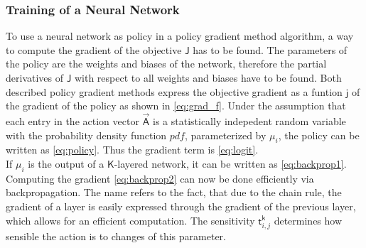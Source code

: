 \subsubsection{Training of a Neural Network}
To use a neural network as policy in a policy gradient method algorithm, a way to compute the gradient of the objective $\mathsf{J}$ has to be found. The parameters of the policy are the weights and biases of the network, therefore the partial derivatives of $\mathsf{J}$ with respect to all weights and biases have to be found. Both described policy gradient methods express the objective gradient as a funtion $\mathsf{j}$ of the gradient of the policy as shown in \eqref{eq:grad_f}. Under the assumption that each entry in the action vector $\vec{\mathsf{A}}$ is a statistically indepedent random variable with the probability density function $pdf$, parameterized by $\mu_i$, the policy can be written as \eqref{eq:policy}. Thus the gradient term is \eqref{eq:logit}. \cite[p. 335]{sutton_reinforcement_2018}\\
If $\mu_i$ is the output of a $\mathsf{K}$-layered network, it can be written as \eqref{eq:backprop1}.
Computing the gradient \eqref{eq:backprop2} can now be done efficiently via backpropagation. The name refers to the fact, that due to the chain rule, the gradient of a layer is easily expressed through the gradient of the previous layer, which allows for an efficient computation. The sensitivity $\mathsf{t}^\mathsf{k}_{i,j}$ determines how sensible the action is to changes of this parameter. \cite[p.11-7 - 11-13]{demuth_neural_2014}
